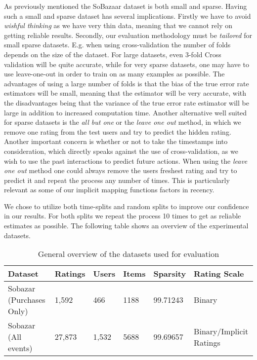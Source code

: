 As previously mentioned the SoBazaar dataset is both small and sparse.
Having such a small and sparse dataset has several implications. Firstly we have
to avoid \emph{wishful thinking} as we have very thin data, meaning that we cannot
rely on getting reliable results. Secondly, our evaluation methodology must be
\emph{tailored} for small sparse datasets. E.g. when using cross-validation the number
of folds depends on the size of the dataset. For large datasets, even 3-fold Cross
validation will be quite accurate, while for very sparse datasets, one may have to
use leave-one-out in order to train on as many examples as possible. The advantages
of using a large number of folds is that the bias of the true error rate estimators
will be small, meaning that the estimator will be very accurate, with the disadvantages
being that the variance of the true error rate estimator will be large in addition to
increased computation time. Another alternative well suited for sparse datasets is the
\emph{all but one} or the \emph{leave one out} method, in which we remove one rating
from the test users and try to predict the hidden rating.
Another important concern is whether or not to take the timestamps into consideration,
which directly speaks against the use of cross-validation, as we wish to use the past
interactions to predict future actions. When using the \emph{leave one out} method one
could always remove the users freshest rating and try to predict it and repeat the
process any number of times. This is particularly relevant as some of our implicit
mapping functions factors in recency.

We chose to utilize both time-splits and random splits to improve our confidence
in our results. For both splits we repeat the process 10 times to get as reliable
estimates as possible. The following table shows an overview of the experimental datasets.

\begin{table}[H]
    \centering
    \begin{tabular}{l l l l l l }
    \toprule
	Dataset						& 	Ratings		& 	Users		& 	Items 		& 	Sparsity	& Rating Scale 				    \\ \midrule
	Sobazar	(Purchases Only) 	&	1,592		&	466			&	1188		&	99.71243	& Binary						\\
	Sobazar (All events)		& 	27,873  	& 	1,532		&	5688		& 	99.69657	& Binary/Implicit Ratings		\\
	\bottomrule
    \end{tabular}
    \caption [Experimental datasets]{General overview of the datasets used for evaluation}
    \label{table:datasets}
\end{table}

